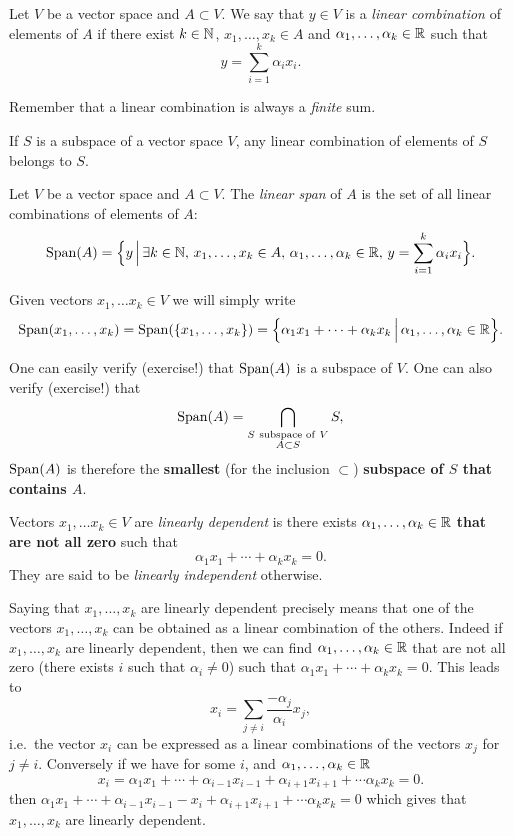 \documentclass[11pt,nocut]{article}
\begin{document}
\begin{definition}
	Let $V$ be a vector space and $A \subset V$. We say that $y \in V$ is a \emph{linear combination} of elements of $A$ if there exist $k \in \mathbb{N}$, $x_1, \dots, x_k \in A$ and $\alpha_1, \dots, \alpha_k \in \mathbb{R}$ such that
	$$
	y = \sum_{i=1}^k \alpha_i x_i.
	$$
\end{definition}

Remember that a linear combination is always a \emph{finite} sum.

\begin{remark}
	If $S$ is a subspace of a vector space $V$, any linear combination of elements of $S$ belongs to $S$.
\end{remark}

\begin{definition}[Span]
	Let $V$ be a vector space and $A \subset V$. The \emph{linear span} of $A$ is the set of all linear combinations of elements of $A$:
	$$
	{{\rm Span}}(A) = 
	\Big\{ y \, \Big| \, \exists k \in \mathbb{N}, \, x_1, \dots, x_k \in A, \, \alpha_1, \dots, \alpha_k \in \mathbb{R}, \, y = \sum_{i=1}^k \alpha_i x_i \Big\}.
	$$
\end{definition}
Given vectors $x_1, \dots x_k \in V$ we will simply write
$$
{{\rm Span}}(x_1, \dots, x_k) = {{\rm Span}}(\{x_1, \dots, x_k \}) =
\Big\{ \alpha_1 x_1 + \cdots + \alpha_k x_k \, \Big| \, \alpha_1, \dots, \alpha_k \in \mathbb{R} \Big\}.
$$

One can easily verify (exercise!) that ${{\rm Span}}(A)$ is a subspace of $V$. One can also verify (exercise!) that
$$
{{\rm Span}}(A) = \bigcap_{\substack{S \ \text{subspace of} \ V \\ A \subset S}} S,
$$
${{\rm Span}}(A)$ is therefore the \textbf{smallest} (for the inclusion $\subset$) \textbf{subspace of $S$ that contains $A$}.

\begin{definition}
	Vectors $x_1, \dots x_k \in V$ are \emph{linearly dependent} is there exists $\alpha_1, \dots, \alpha_k \in \mathbb{R}$ \textbf{that are not all zero} such that 
	$$
	\alpha_1 x_1 + \cdots + \alpha_k x_k = 0.
	$$
	They are said to be \emph{linearly independent} otherwise.
\end{definition}

Saying that $x_1, \dots, x_k$ are linearly dependent precisely means that one of the vectors $x_1, \dots, x_k$ can be obtained as a linear combination of the others. 
Indeed if $x_1, \dots, x_k$ are linearly dependent, then we can find $\alpha_1, \dots, \alpha_k \in \mathbb{R}$ that are not all zero (there exists $i$ such that $\alpha_i \neq 0$) such that $\alpha_1 x_1 + \cdots + \alpha_k x_k = 0$. This leads to
$$
x_i = \sum_{j \neq i} \frac{- \alpha_j}{\alpha_i} x_j,
$$
i.e.\ the vector $x_i$ can be expressed as a linear combinations of the vectors $x_j$ for $j \neq i$.
Conversely if we have for some $i$, and $\alpha_1, \dots, \alpha_k \in \mathbb{R}$
$$
x_i = \alpha_1 x_1 + \cdots + \alpha_{i-1} x_{i-1} + \alpha_{i+1} x_{i+1} + \cdots \alpha_k x_k = 0.
$$
then $\alpha_1 x_1 + \cdots + \alpha_{i-1} x_{i-1} - x_i + \alpha_{i+1} x_{i+1} + \cdots \alpha_k x_k = 0$ which gives that $x_1, \dots, x_k$ are linearly dependent. 
\\
\end{document}

